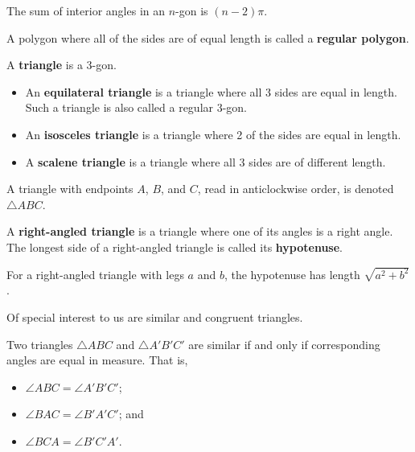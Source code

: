 \begin{proposition}
    The sum of interior angles in an $n$-gon is $(n-2)\pi$.
\end{proposition}

\begin{definition}
    A polygon where all of the sides are of equal length is called a \textbf{regular polygon}.
\end{definition}

\begin{definition}
    A \textbf{triangle} is a 3-gon.
    \begin{itemize}
        \item An \textbf{equilateral triangle} is a triangle where all 3 sides are equal in length. Such a triangle is also called a regular 3-gon.
        \item An \textbf{isosceles triangle} is a triangle where 2 of the sides are equal in length.
        \item A \textbf{scalene triangle} is a triangle where all 3 sides are of different length.
    \end{itemize}
    A triangle with endpoints $A$, $B$, and $C$, read in anticlockwise order, is denoted $\triangle ABC$.
\end{definition}

\begin{definition}
    A \textbf{right-angled triangle} is a triangle where one of its angles is a right angle. The longest side of a right-angled triangle is called its \textbf{hypotenuse}.
\end{definition}

\begin{theorem}[Pythagoras]
    For a right-angled triangle with legs $a$ and $b$, the hypotenuse has length $\sqrt{a^2 + b^2}$.
\end{theorem}

Of special interest to us are similar and congruent triangles.

\begin{definition}
    Two triangles $\triangle ABC$ and $\triangle A'B'C'$ are similar if and only if corresponding angles are equal in measure. That is,
    \begin{itemize}
        \item $\angle ABC = \angle A'B'C'$;
        \item $\angle BAC = \angle B'A'C'$; and
        \item $\angle BCA = \angle B'C'A'$.
    \end{itemize}
\end{definition}

